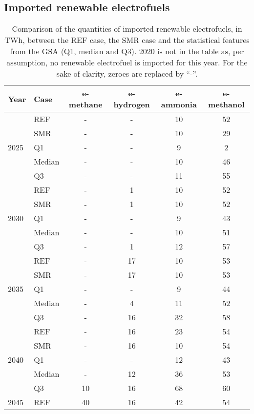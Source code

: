 \subsection{Imported renewable electrofuels}
\label{app:UQ_electrofuels}
\begin{table}[htbp!]
\caption{Comparison of the quantities of imported renewable electrofuels, in TWh, between the REF case, the SMR case and the statistical features from the \gls{GSA} (\ie Q1, median and Q3). 2020 is not in the table as, per assumption, no renewable electrofuel is imported for this year. For the sake of clarity, zeroes are replaced by ``-''.}
\label{tab:uq_ref_smr_med}
\begin{minipage}{\linewidth}
\centering
\begin{tabular}{l l | c c c c}
\toprule
\textbf{Year} & \textbf{Case} & \textbf{e-methane} & \textbf{e-hydrogen} & \textbf{e-ammonia} & \textbf{e-methanol}\\	
\toprule							
\multirow{5}{*}{2025}
 & REF & - & - & 10 & 52\\
 & SMR & - & -  & 10 & 29\\
 \cmidrule{2 - 6}
 & Q1 & - & - & 9 & 2\\
 & Median & - & - & 10 & 46\\
 & Q3 & - & - & 11 & 55\\
\toprule
\multirow{5}{*}{2030}
 & REF & - & 1 & 10 & 52\\
 & SMR & - & 1 & 10 & 52\\
 \cmidrule{2 - 6}
 & Q1 & - & - & 9 & 43\\
 & Median & - & - & 10 & 51\\
 & Q3 & - & 1 & 12 & 57\\
\toprule
\multirow{5}{*}{2035}
 & REF & - & 17 & 10 & 53\\
 & SMR & - & 17 & 10 & 53\\
 \cmidrule{2 - 6}
 & Q1 & - & - & 9 & 44\\
 & Median & - & 4 & 11 & 52\\
 & Q3 & - & 16 & 32 & 58\\
\toprule
\multirow{5}{*}{2040}
 & REF & - & 16 & 23 & 54\\
 & SMR & - & 16 & 10 & 54\\
 \cmidrule{2 - 6}
 & Q1 & - & - & 12 & 43\\
 & Median & - & 12 & 36 & 53\\
 & Q3 & 10 & 16 & 68 & 60\\
\toprule
\multirow{5}{*}{2045}
 & REF & 40 & 16 & 42 & 54\\

\end{tabular}
\end{minipage}
\end{table}
